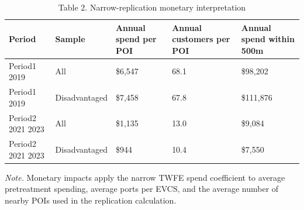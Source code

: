 \begin{table}[!htbp]
\centering
\caption{Table 2. Narrow-replication monetary interpretation}
\begin{tabular}{lllll}
\toprule
Period & Sample & Annual spend per POI & Annual customers per POI & Annual spend within 500m \\
\midrule
Period1 2019 & All & \$6,547 & 68.1 & \$98,202 \\
Period1 2019 & Disadvantaged & \$7,458 & 67.8 & \$111,876 \\
Period2 2021 2023 & All & \$1,135 & 13.0 & \$9,084 \\
Period2 2021 2023 & Disadvantaged & \$944 & 10.4 & \$7,550 \\
\bottomrule
\end{tabular}
\begin{minipage}{0.95\linewidth}\footnotesize\emph{Note.} Monetary impacts apply the narrow TWFE spend coefficient to average pretreatment spending, average ports per EVCS, and the average number of nearby POIs used in the replication calculation.\end{minipage}
\end{table}
